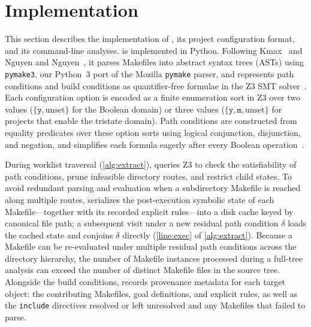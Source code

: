 \documentclass[acmsmall,screen,review,anonymous,nonacm]{acmart}
\begin{document}
\section{Implementation}\label{sec:impl}

This section describes the implementation of \tool{}, its project configuration format, and its command-line analyses.
\tool{} is implemented in Python.
Following Kmax~\cite{gazzillo2017kmax} and Nguyen and Nguyen~\cite{nguyen2020kbuild}, it parses Makefiles into abstract syntax trees (ASTs) using \texttt{pymake3}, our Python~3 port of the Mozilla \texttt{pymake} parser, and represents path conditions and build conditions as quantifier-free formulae in the Z3 SMT solver~\cite{demoura2008z3}.
Each configuration option is encoded as a finite enumeration sort in Z3 over two values ($\{\texttt{y}, \text{unset}\}$ for the Boolean domain) or three values ($\{\texttt{y}, \texttt{m}, \text{unset}\}$ for projects that enable the tristate domain).
Path conditions are constructed from equality predicates over these option sorts using logical conjunction, disjunction, and negation, and \tool{} simplifies each formula eagerly after every Boolean operation~\cite{sen2015multise}.

During worklist traversal (\autoref{alg:extract}), \tool{} queries Z3 to check the satisfiability of path conditions, prune infeasible directory routes, and restrict child states.
To avoid redundant parsing and evaluation when a subdirectory Makefile is reached along multiple routes, \tool{} serializes the post-execution symbolic state of each Makefile---together with its recorded explicit rules---into a disk cache keyed by canonical file path; a subsequent visit under a new residual path condition $\delta$ loads the cached state and conjoins $\delta$ directly (\autoref{line:exec} of \autoref{alg:extract}).
Because a Makefile can be re-evaluated under multiple residual path conditions across the directory hierarchy, the number of Makefile instances processed during a full-tree analysis can exceed the number of distinct Makefile files in the source tree.
Alongside the build conditions, \tool{} records provenance metadata for each target object: the contributing Makefiles, goal definitions, and explicit rules, as well as the \texttt{include} directives resolved or left unresolved and any Makefiles that failed to parse.
\end{document}
